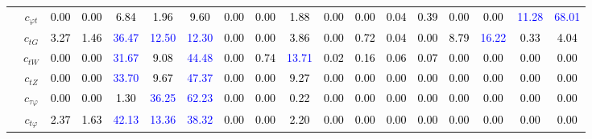 \documentclass{article}
\begin{document}
\begin{landscape}
\begin{table}[H]
\begin{tabular}{|c|c|c|c|c|c|c|c|c|c|c|c|c|c|c|c|c|c|}
 & $c_{\varphi t}$ & \textcolor{black}{0.00} & \textcolor{black}{0.00} & \textcolor{black}{6.84} & \textcolor{black}{1.96} & \textcolor{black}{9.60} & \textcolor{black}{0.00} & \textcolor{black}{0.00} & \textcolor{black}{1.88} & \textcolor{black}{0.00} & \textcolor{black}{0.00} & \textcolor{black}{0.04} & \textcolor{black}{0.39} & \textcolor{black}{0.00} & \textcolor{black}{0.00} & \textcolor{blue}{11.28} & \textcolor{blue}{68.01}\\ \cline{2-18}
 & $c_{tG}$ & \textcolor{black}{3.27} & \textcolor{black}{1.46} & \textcolor{blue}{36.47} & \textcolor{blue}{12.50} & \textcolor{blue}{12.30} & \textcolor{black}{0.00} & \textcolor{black}{0.00} & \textcolor{black}{3.86} & \textcolor{black}{0.00} & \textcolor{black}{0.72} & \textcolor{black}{0.04} & \textcolor{black}{0.00} & \textcolor{black}{8.79} & \textcolor{blue}{16.22} & \textcolor{black}{0.33} & \textcolor{black}{4.04}\\ \cline{2-18}
 & $c_{tW}$ & \textcolor{black}{0.00} & \textcolor{black}{0.00} & \textcolor{blue}{31.67} & \textcolor{black}{9.08} & \textcolor{blue}{44.48} & \textcolor{black}{0.00} & \textcolor{black}{0.74} & \textcolor{blue}{13.71} & \textcolor{black}{0.02} & \textcolor{black}{0.16} & \textcolor{black}{0.06} & \textcolor{black}{0.07} & \textcolor{black}{0.00} & \textcolor{black}{0.00} & \textcolor{black}{0.00} & \textcolor{black}{0.00}\\ \cline{2-18}
 & $c_{tZ}$ & \textcolor{black}{0.00} & \textcolor{black}{0.00} & \textcolor{blue}{33.70} & \textcolor{black}{9.67} & \textcolor{blue}{47.37} & \textcolor{black}{0.00} & \textcolor{black}{0.00} & \textcolor{black}{9.27} & \textcolor{black}{0.00} & \textcolor{black}{0.00} & \textcolor{black}{0.00} & \textcolor{black}{0.00} & \textcolor{black}{0.00} & \textcolor{black}{0.00} & \textcolor{black}{0.00} & \textcolor{black}{0.00}\\ \cline{2-18}
 & $c_{\tau \varphi}$ & \textcolor{black}{0.00} & \textcolor{black}{0.00} & \textcolor{black}{1.30} & \textcolor{blue}{36.25} & \textcolor{blue}{62.23} & \textcolor{black}{0.00} & \textcolor{black}{0.00} & \textcolor{black}{0.22} & \textcolor{black}{0.00} & \textcolor{black}{0.00} & \textcolor{black}{0.00} & \textcolor{black}{0.00} & \textcolor{black}{0.00} & \textcolor{black}{0.00} & \textcolor{black}{0.00} & \textcolor{black}{0.00}\\ \cline{2-18}
 & $c_{t \varphi}$ & \textcolor{black}{2.37} & \textcolor{black}{1.63} & \textcolor{blue}{42.13} & \textcolor{blue}{13.36} & \textcolor{blue}{38.32} & \textcolor{black}{0.00} & \textcolor{black}{0.00} & \textcolor{black}{2.20} & \textcolor{black}{0.00} & \textcolor{black}{0.00} & \textcolor{black}{0.00} & \textcolor{black}{0.00} & \textcolor{black}{0.00} & \textcolor{black}{0.00} & \textcolor{black}{0.00} & \textcolor{black}{0.00}\\ \hline

\end{tabular}
\end{table}
\end{landscape}
\end{document}
